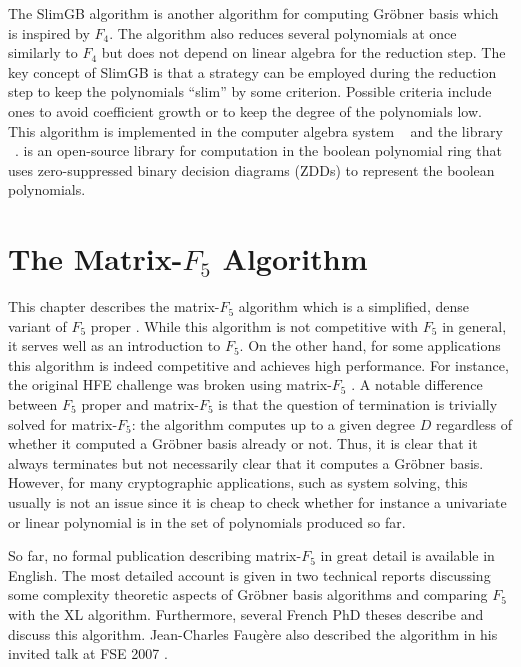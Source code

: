 The SlimGB \cite{slimgb} algorithm is another algorithm for computing Gr\"obner basis which is inspired by $F_4$. The algorithm also reduces several polynomials at once similarly to $F_4$ but does not depend on linear algebra for the reduction step. The key concept of SlimGB is that a strategy can be employed during the reduction step to keep the polynomials ``slim'' by some criterion. Possible criteria include ones to avoid coefficient growth or to keep the degree of the polynomials low. This algorithm is implemented in the computer algebra system \Singular~\cite{singular} and the library \PolyBoRi~\cite{polybori}. \PolyBoRi is an open-source library for computation in the boolean polynomial ring that uses zero-suppressed binary decision diagrams (ZDDs) to represent the boolean polynomials.

\chapter{The Matrix-\texorpdfstring{$F_5$}{F5} Algorithm}
\label{chapter:f5matrix}
This chapter describes the matrix-$F_5$ algorithm which is a simplified, dense variant of $F_5$ proper \cite{f5}. While this algorithm is not competitive with $F_5$ in general, it serves well as an introduction to $F_5$. On the other hand, for some applications this algorithm is indeed competitive and achieves high performance. For instance, the original HFE challenge was broken using matrix-$F_5$ \cite{faugere-joux:crypto03}. A notable difference between $F_5$ proper and matrix-$F_5$ is that the question of termination is trivially solved for matrix-$F_5$: the algorithm computes up to a given degree $D$ regardless of whether it computed a Gröbner basis already or not. Thus, it is clear that it always terminates but not necessarily clear that it computes a Gröbner basis. However, for many cryptographic applications, such as system solving, this usually is not an issue since it is cheap to check whether for instance a univariate or linear polynomial is in the set of polynomials produced so far.

So far, no formal publication describing matrix-$F_5$ in great detail is available in English. The most detailed account is given in two technical reports \cite{bardet-faugere-salvy:tech,faugere-ars-2004} discussing some complexity theoretic aspects of Gröbner basis algorithms and comparing $F_5$ with the XL algorithm. Furthermore, several French PhD theses \cite{bardet:thesis2004,ars:thesis2005,perret:thesis2005} describe and discuss this algorithm. Jean-Charles Faug{\`e}re also described the algorithm in his invited talk at FSE 2007 \cite{faugere:fse2007}.

